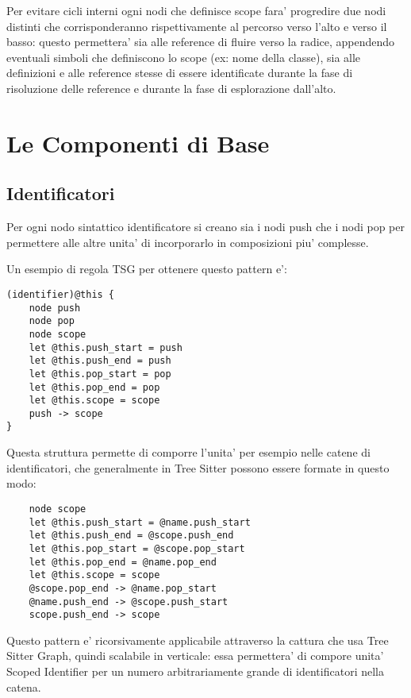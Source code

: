 \par
Per evitare cicli interni ogni nodi che definisce scope fara' progredire due nodi distinti che corrisponderanno rispettivamente al percorso verso l'alto e verso il basso: questo permettera' sia alle reference di fluire verso la radice, appendendo eventuali simboli che definiscono lo scope (ex: nome della classe), sia alle definizioni e alle reference stesse di essere identificate durante la fase di risoluzione delle reference e durante la fase di esplorazione dall'alto.

\section{Le Componenti di Base}


\subsection{Identificatori}

Per ogni nodo sintattico identificatore si creano sia i nodi push che i nodi pop per permettere alle altre unita' di incorporarlo in composizioni piu' complesse.


Un esempio di regola TSG per ottenere questo pattern e':

\begin{lstlisting}
(identifier)@this {
    node push
    node pop
    node scope
    let @this.push_start = push
    let @this.push_end = push
    let @this.pop_start = pop
    let @this.pop_end = pop
    let @this.scope = scope
    push -> scope
}
\end{lstlisting}

Questa struttura permette di comporre l'unita' per esempio nelle catene di identificatori, che generalmente in Tree Sitter possono essere formate in questo modo:

\begin{lstlisting}
    node scope
    let @this.push_start = @name.push_start
    let @this.push_end = @scope.push_end
    let @this.pop_start = @scope.pop_start
    let @this.pop_end = @name.pop_end
    let @this.scope = scope
    @scope.pop_end -> @name.pop_start
    @name.push_end -> @scope.push_start
    scope.push_end -> scope
\end{lstlisting}

Questo pattern e' ricorsivamente applicabile attraverso la cattura che usa Tree Sitter Graph, quindi scalabile in verticale: essa permettera' di compore unita' Scoped Identifier per un numero arbitrariamente grande di identificatori nella catena.

